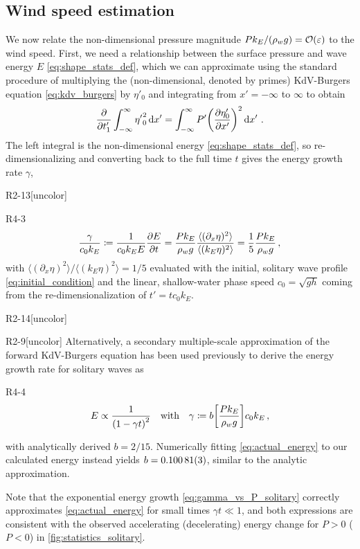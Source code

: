 \documentclass{jfm}
\renewcommand*{\epsilon}{\varepsilon}
\begin{document}
\subsection{\label{sec:press_mag} Wind speed estimation}
We now relate the non-dimensional pressure magnitude $P k_E/(\rho_w g) =
\order{\epsilon}$ to the wind speed.
First, we need a relationship between the surface pressure and wave
energy $E$ \cref{eq:shape_stats_def}, which we can approximate using the
standard procedure \citep[\eg][]{mei2005nonlinear} of multiplying the
(non-dimensional, denoted by primes) KdV-Burgers equation
\cref{eq:kdv_burgers} by $\eta'_0$ and integrating from $x'=-\infty$ to
$\infty$ to obtain
\begin{equation}
  \pdv{t'_1} \int_{-\infty}^{\infty} {\eta'}_0^2 \dd{x'}
  = \int_{-\infty}^{\infty} P' \pqty{\pdv{\eta'_0}{x'}}^2
  \dd{x'} \,.
  \label{eq:energy_nondim}
\end{equation}
The left integral is the non-dimensional energy
\cref{eq:shape_stats_def}, so re-dimensionalizing and converting back to
the full time $t$ gives the energy growth rate $\gamma$,
\begin{LineLabel}{R2-13}[uncolor]
\begin{LineLabel}{R4-3}
\begin{equation}
  \frac{\gamma}{c_0 k_E} \coloneqq
  \frac{1}{c_0 k_E E} \pdv{E}{t}
  = \frac{P k_E}{\rho_w g} \frac{\langle (\partial_x \eta)^2 \rangle}
    {\langle (k_E \eta)^2 \rangle}
  = \frac{1}{5} \frac{P k_E}{\rho_w g}
  \,,
  \label{eq:gamma_vs_P_solitary}
\end{equation}
with $\langle (\partial_x \eta)^2 \rangle / \langle (k_E \eta)^2 \rangle
= 1/5$ evaluated with the initial, solitary wave profile
\cref{eq:initial_condition} and the linear, shallow-water phase speed
$c_0 = \sqrt{gh}$ coming from the re-dimensionalization of $t' = t c_0
k_E$.
\end{LineLabel}
\end{LineLabel}
\begin{LineLabel}{R2-14}[uncolor]
\begin{LineLabel}{R2-9}[uncolor]
Alternatively, a secondary multiple-scale approximation of the
forward KdV-Burgers equation has been used previously to derive
the energy growth rate for solitary waves as~\citep{zdyrski2019effects}
\end{LineLabel}
\begin{LineLabel}{R4-4}
\begin{equation}
  E \propto \frac{1}{\pqty{1 - \gamma t}^2}
  \qq{with}
  \gamma \coloneqq b \bqty{\frac{P k_E}{\rho_w g}} c_0 k_E
  \,,
  \label{eq:actual_energy}
\end{equation}
\end{LineLabel}
with analytically derived $b = 2/15$.
Numerically fitting \cref{eq:actual_energy} to our calculated energy
instead yields $b = \num{0.10081 \pm 0.00003}$, similar to the analytic
approximation.
\end{LineLabel}
Note that the exponential energy growth \cref{eq:gamma_vs_P_solitary}
correctly approximates \cref{eq:actual_energy} for small times $\gamma t
\ll 1$, and both expressions are consistent with the observed
accelerating (decelerating) energy change for $P>0$ ($P<0$) in
\cref{fig:statistics_solitary}.
\end{document}
